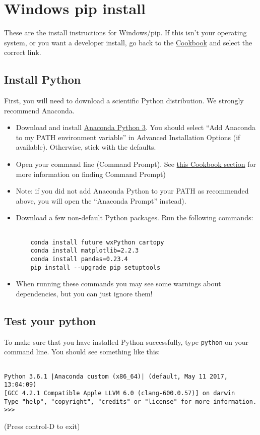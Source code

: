 \documentclass[11pt]{article}
\begin{document}
\tableofcontents

\section{Windows pip install}

These are the install instructions for Windows/pip.  If this isn't your operating system, or you want a developer install, go back to the \href{https://earthref.org/PmagPy/cookbook/#next_steps}{Cookbook} and select the correct link.


\subsection{Install Python}
First, you will need to download a scientific Python distribution.  We strongly recommend Anaconda.

   \begin{itemize}
   \item Download and install \href{https://www.anaconda.com/download}{Anaconda Python 3}.  You should select ``Add Anaconda to my PATH environment variable'' in Advanced Installation Options (if available).  Otherwise, stick with the defaults.
   \item Open your command line (Command Prompt).  See \href{https://earthref.org/PmagPy/cookbook/#command_line}{this Cookbook section} for more information on finding Command Prompt)
   \item Note: if you did not add Anaconda Python to your PATH as recommended above, you will open the ``Anaconda Prompt'' instead).
   \item Download a few non-default Python packages.  Run the following commands: \begin{verbatim}

    conda install future wxPython cartopy
    conda install matplotlib=2.2.3
    conda install pandas=0.23.4
    pip install --upgrade pip setuptools
\end{verbatim}
   \item When running these commands you may see some warnings about dependencies, but you can just ignore them!

\end{itemize}


\subsection{Test your python}

To make sure that you have installed Python successfully, type \texttt{python} on your command line.  You should see something like this: \begin{verbatim}

Python 3.6.1 |Anaconda custom (x86_64)| (default, May 11 2017, 13:04:09)
[GCC 4.2.1 Compatible Apple LLVM 6.0 (clang-600.0.57)] on darwin
Type "help", "copyright", "credits" or "license" for more information.
>>>\end{verbatim}
(Press control-D to exit)
\end{document}
